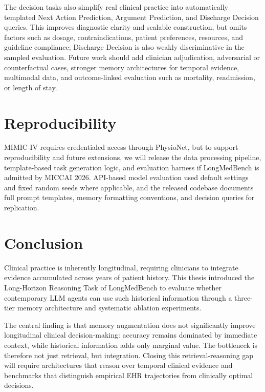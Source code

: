 The decision tasks also simplify real clinical practice into automatically templated Next Action Prediction, Argument Prediction, and Discharge Decision queries. This improves diagnostic clarity and scalable construction, but omits factors such as dosage, contraindications, patient preferences, resources, and guideline compliance; Discharge Decision is also weakly discriminative in the sampled evaluation. Future work should add clinician adjudication, adversarial or counterfactual cases, stronger memory architectures for temporal evidence, multimodal data, and outcome-linked evaluation such as mortality, readmission, or length of stay.

\section{Reproducibility}

MIMIC-IV requires credentialed access through PhysioNet, but to support reproducibility and future extensions, we will release the data processing pipeline, template-based task generation logic, and evaluation harness if LongMedBench is admitted by MICCAI 2026. API-based model evaluation used default settings and fixed random seeds where applicable, and the released codebase documents full prompt templates, memory formatting conventions, and decision queries for replication.

\section{Conclusion}

Clinical practice is inherently longitudinal, requiring clinicians to integrate evidence accumulated across years of patient history. This thesis introduced the Long-Horizon Reasoning Task of LongMedBench to evaluate whether contemporary LLM agents can use such historical information through a three-tier memory architecture and systematic ablation experiments.

The central finding is that memory augmentation does not significantly improve longitudinal clinical decision-making: accuracy remains dominated by immediate context, while historical information adds only marginal value. The bottleneck is therefore not just retrieval, but integration. Closing this retrieval-reasoning gap will require architectures that reason over temporal clinical evidence and benchmarks that distinguish empirical EHR trajectories from clinically optimal decisions.
